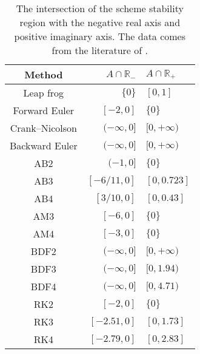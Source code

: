 \documentclass{article}
\begin{document}
\begin{table}
  \caption{The intersection of the scheme stability region with the negative real axis and positive imaginary axis. The data comes from the literature of \citet{Canuto:2007}.}
  \centering
  \begin{tabular}{crl}
    \toprule
    Method            & $A \cap \mathbb{R}_{-}$ & $A \cap \mathbb{R}_{+}$ \\
    \midrule
    Leap frog         & $\{0\}         $        & $[0, 1]      $          \\
    Forward Euler     & $[-2, 0]       $        & $\{0\}       $          \\
    Crank--Nicolson   & $(-\infty, 0]  $        & $[0, +\infty)$          \\
    Backward Euler    & $(-\infty, 0]  $        & $[0, +\infty)$          \\
    \midrule
    AB2               & $(-1, 0]       $        & $\{0\}       $          \\
    AB3               & $[-6/11, 0]    $        & $[0, 0.723]  $          \\
    AB4               & $[3/10, 0]     $        & $[0, 0.43]   $          \\
    AM3               & $[-6, 0]       $        & $\{0\}       $          \\
    AM4               & $[-3, 0]       $        & $\{0\}       $          \\
    \midrule
    BDF2              & $(-\infty, 0]  $        & $[0, +\infty)$          \\
    BDF3              & $(-\infty, 0]  $        & $[0, 1.94)   $          \\
    BDF4              & $(-\infty, 0]  $        & $[0, 4.71)   $          \\
    \midrule
    RK2               & $[-2, 0]       $        & $\{0\}       $          \\
    RK3               & $[-2.51, 0]    $        & $[0, 1.73]   $          \\
    RK4               & $[-2.79, 0]    $        & $[0, 2.83]   $          \\
    \bottomrule
  \end{tabular}
  \label{tab:stabReg}
\end{table}
\end{document}
